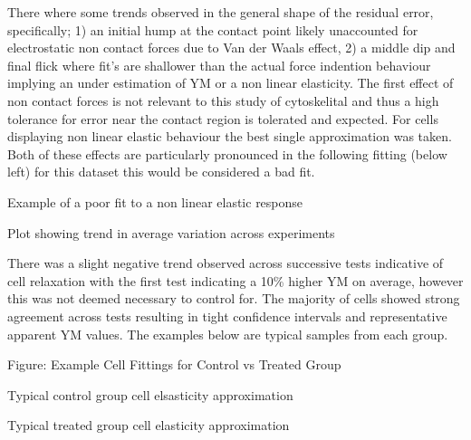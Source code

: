\documentclass[
  paper=a4,
  ,captions=tableheading
]{scrartcl}
\makeatletter
\newcommand*\pandocbounded[1]{%
  \sbox\pandoc@box{#1}%
  \Gscale@div\@tempa{\textheight}{\dimexpr\ht\pandoc@box+\dp\pandoc@box\relax}%
  \Gscale@div\@tempb{\linewidth}{\wd\pandoc@box}%
  \ifdim\@tempb\p@<\@tempa\p@\let\@tempa\@tempb\fi%
  \ifdim\@tempa\p@<\p@\scalebox{\@tempa}{\usebox\pandoc@box}%
  \else\usebox{\pandoc@box}%
  \fi%
}
\renewenvironment{quote}{\begin{customblockquote}\list{}{\rightmargin=0em\leftmargin=0em}%
\item\relax\color{blockquote-text}\ignorespaces}{\unskip\unskip\endlist\end{customblockquote}}
\makeatother
\begin{document}
There where some trends observed in the general shape of the residual
error, specifically; 1) an initial hump at the contact point likely
unaccounted for electrostatic non contact forces due to Van der Waals
effect, 2) a middle dip and final flick where fit's are shallower than
the actual force indention behaviour implying an under estimation of YM
or a non linear elasticity. The first effect of non contact forces is
not relevant to this study of cytoskelital and thus a high tolerance for
error near the contact region is tolerated and expected. For cells
displaying non linear elastic behaviour the best single approximation
was taken. Both of these effects are particularly pronounced in the
following fitting (below left) for this dataset this would be considered
a bad fit.

\noindent
\begin{minipage}[t]{0.48\textwidth}
\begin{quote}
\pandocbounded{}
Example of a poor fit to a non linear elastic response
\end{quote}
\end{minipage}
\hfill
\begin{minipage}[t]{0.48\textwidth}
\begin{quote}
\pandocbounded{}
Plot showing trend in average variation across experiments
\end{quote}
\end{minipage}

There was a slight negative trend observed across successive tests
indicative of cell relaxation with the first test indicating a 10\%
higher YM on average, however this was not deemed necessary to control
for. The majority of cells showed strong agreement across tests
resulting in tight confidence intervals and representative apparent YM
values. The examples below are typical samples from each group.

Figure: Example Cell Fittings for Control vs Treated Group

\noindent
\begin{minipage}[t]{0.48\textwidth}
\begin{quote}
\pandocbounded{}
Typical control group cell elsasticity approximation
\end{quote}
\end{minipage}
\hfill
\begin{minipage}[t]{0.48\textwidth}
\begin{quote}
\pandocbounded{}
Typical treated group cell elasticity approximation
\end{quote}
\end{minipage}
\end{document}
